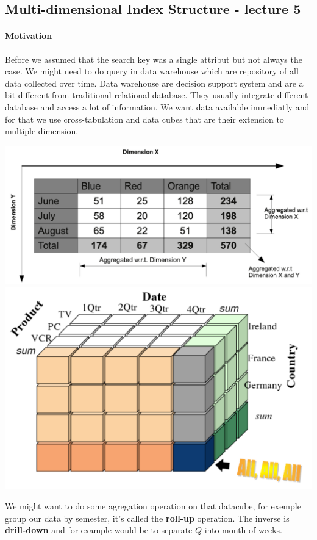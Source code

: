 \documentclass[12pt,a4paper]{article}
\begin{document}
\subsection{Multi-dimensional Index Structure - lecture 5}
\paragraph{Motivation}
Before we assumed that the search key was a single attribut but not always the case. We might need to do query in data warehouse which are repository of all data collected over time. Data warehouse are decision support system and are a bit different from traditional relational database. They usually integrate different database and access a lot of information. We want data available immediatly and for that we use cross-tabulation and data cubes that are their extension to multiple dimension. 
\begin{center}
\includegraphics[scale=0.35]{img/img49.png}
\includegraphics[scale=0.35]{img/img50.png}
\end{center}
We might want to do some agregation operation on that datacube, for exemple group our data by semester, it's called the \textbf{roll-up} operation. The inverse is \textbf{drill-down} and for example would be to separate $Q$ into month of weeks.\\
\end{document}
